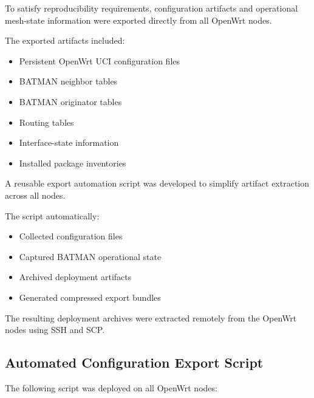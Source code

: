 \documentclass[conference]{IEEEtran}
\begin{document}
To satisfy reproducibility requirements, configuration artifacts and operational mesh-state information were exported directly from all OpenWrt nodes.

The exported artifacts included:

\begin{itemize}
    \item Persistent OpenWrt UCI configuration files
    \item BATMAN neighbor tables
    \item BATMAN originator tables
    \item Routing tables
    \item Interface-state information
    \item Installed package inventories
\end{itemize}

A reusable export automation script was developed to simplify artifact extraction across all nodes.

The script automatically:
\begin{itemize}
    \item Collected configuration files
    \item Captured BATMAN operational state
    \item Archived deployment artifacts
    \item Generated compressed export bundles
\end{itemize}

The resulting deployment archives were extracted remotely from the OpenWrt nodes using SSH and SCP.

\subsection{Automated Configuration Export Script}

The following script was deployed on all OpenWrt nodes:
\end{document}
